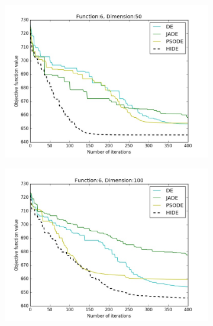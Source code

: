 \documentclass[a4paper,twoside]{article}
\begin{document}
\begin{figure}[t!]
    \begin{subfigure}[b]{0.24\textwidth}
        \includegraphics[width=\textwidth,natwidth=800,natheight=600]{plot_50D_F6_save}
        \caption{}
    \end{subfigure}
    \begin{subfigure}[b]{0.24\textwidth}
        \includegraphics[width=\textwidth,natwidth=800,natheight=600]{plot_100D_F6_save}
        \caption{}
    \end{subfigure}        
    \begin{subfigure}[b]{0.24\textwidth}

\end{subfigure}
\end{figure}
\end{document}
